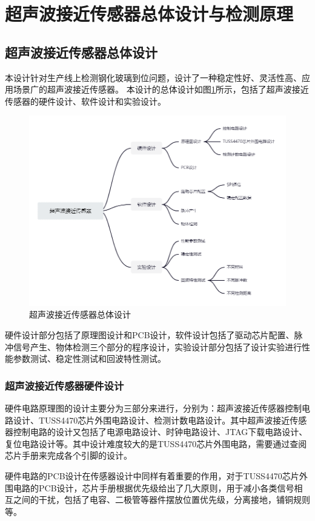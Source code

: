 \newpage
\section{超声波接近传感器总体设计与检测原理}
\subsection{超声波接近传感器总体设计}
本设计针对生产线上检测钢化玻璃到位问题，设计了一种稳定性好、灵活性高、应用场景广的超声波接近传感器。
本设计的总体设计如图\ref{超声波接近传感器总体设计}所示，包括了超声波接近传感器的硬件设计、软件设计和实验设计。
\begin{figure}[ht]
	\centering
	\includegraphics[width=12cm]{figure/overall designment.png}
	\caption{超声波接近传感器总体设计}
	\label{超声波接近传感器总体设计}
\end{figure}

硬件设计部分包括了原理图设计和PCB设计，软件设计包括了驱动芯片配置、脉冲信号产生、物体检测三个部分的程序设计，实验设计部分包括了设计实验进行性能参数测试、稳定性测试和回波特性测试。
\subsubsection{超声波接近传感器硬件设计}
硬件电路原理图的设计主要分为三部分来进行，分别为：超声波接近传感器控制电路设计、TUSS4470芯片外围电路设计、检测计数电路设计。其中超声波接近传感器控制电路的设计又包括了电源电路设计、时钟电路设计、JTAG下载电路设计、复位电路设计等。其中设计难度较大的是TUSS4470芯片外围电路，需要通过查阅芯片手册来完成各个引脚的设计。\par
硬件电路的PCB设计在传感器设计中同样有着重要的作用，对于TUSS4470芯片外围电路的PCB设计，芯片手册根据优先级给出了几大原则，用于减小各类信号相互之间的干扰，包括了电容、二极管等器件摆放位置优先级，分离接地，铺铜规则等。
